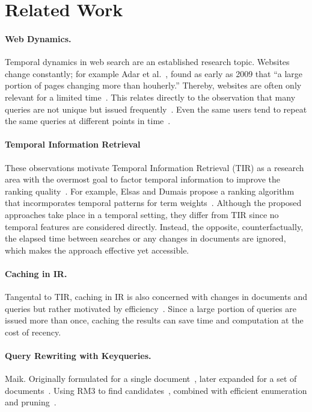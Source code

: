 \section{Related Work}
\label{sec:related-work}

\paragraph{Web Dynamics.}
Temporal dynamics in web search are an established research topic. Websites change constantly; for example Adar et al.~\cite{DBLP:conf/wsdm/AdarTDE09}, found as early as 2009 that ``a large portion of pages changing more than houherly.'' Thereby, websites are often only relevant for a limited time~\cite{DBLP:conf/sigir/TikhonovBBOKG13}. This relates directly to the observation that many queries are not unique but issued frequently~\cite{DBLP:conf/sigir/Dumais14,DBLP:journals/sigir/SilversteinHMM99}. Even the same users tend to repeat the same queries at different points in time~\cite{DBLP:conf/wsdm/TylerT10}.

\paragraph{Temporal Information Retrieval}
These observations motivate Temporal Information Retrieval (TIR) as a research area with the overmost goal to factor temporal information to improve the ranking quality~\cite{DBLP:journals/ftir/KanhabuaBN15,DBLP:journals/csur/CamposDJJ14}. For example, Elsas and Dumais propose a ranking algorithm that incormporates temporal patterns for term weights~\cite{DBLP:conf/wsdm/ElsasD10}. Although the proposed approaches take place in a temporal setting, they differ from TIR since no temporal features are considered directly. Instead, the opposite, counterfactually, the elapsed time between searches or any changes in documents are ignored, which makes the approach effective yet accessible.

\paragraph{Caching in IR.}
Tangental to TIR, caching in IR is also concerned with changes in documents and queries but rather motivated by efficiency~\cite{DBLP:conf/www/CambazogluJPBCLB10,DBLP:conf/sigir/Baeza-YatesGJMPS07}. Since a large portion of queries are issued more than once, caching the results can save time and computation at the cost of recency.


\paragraph{Query Rewriting with Keyqueries.} {\color{red} Maik.} Originally formulated for a single document~\cite{gollub:2013a}, later expanded for a set of documents~\cite{hagen:2016b}. Using RM3 to find candidates~\cite{froebe:2022d}, combined with efficient enumeration and pruning~\cite{froebe:2021c}.

